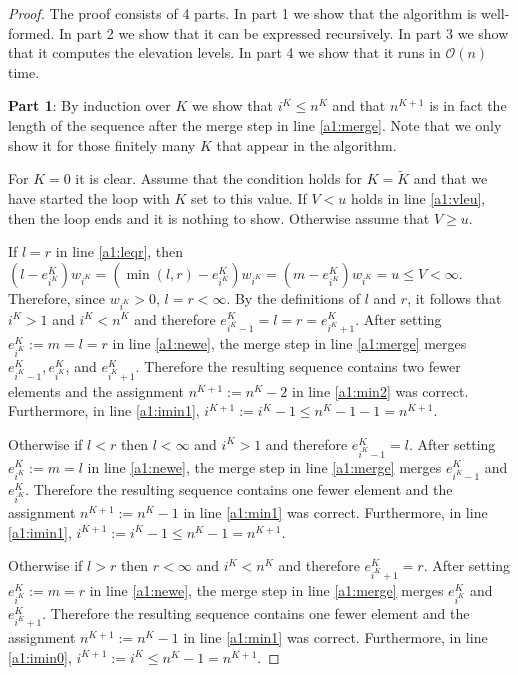 \documentclass[11pt,a4paper]{article}
\newcommand{\bO}{\mathcal{O}}
\begin{document}
\begin{proof}
The proof consists of 4 parts. In part 1 we show that the algorithm is well-formed.
In part 2 we show that it can be expressed recursively.
In part 3 we show that it computes the elevation levels.
In part 4 we show that it runs in $\bO(n)$ time.

\textbf{Part 1}: By induction over $K$ we show that $i^K \le n^K$ and that $n^{K+1}$ is in fact the length of the sequence after the merge step in line \ref{a1:merge}.
Note that we only show it for those finitely many $K$ that appear in the algorithm.

For $K=0$ it is clear.
Assume that the condition holds for $K = \tilde{K}$ and that we have started the loop with $K$ set to this value.
If $V < u$ holds in line \ref{a1:vleu}, then the loop ends and it is nothing to show.
Otherwise assume that $V \ge u$.

If $l = r$ in line \ref{a1:leqr}, then $(l - e_{i^K}^K)w_{i^K} = (\min(l,r) - e_{i^K}^K)w_{i^K} = (m - e_{i^K}^K)w_{i^K} = u \le V < \infty$.
Therefore, since $w_{i^K} > 0$, $l = r < \infty$.
By the definitions of $l$ and $r$, it follows that $i^K > 1$ and $i^K < n^K$ and therefore
$e_{i^K-1}^K = l = r = e_{i^K+1}^K$.
After setting $e_{i^K}^K := m = l = r$ in line \ref{a1:newe}, the merge step in line \ref{a1:merge} merges $e_{i^K - 1}^K, e_{i^K}^K$, and $e_{i^K + 1}^K$.
Therefore the resulting sequence contains two fewer elements and the assignment $n^{K+1} := n^K - 2$ in line \ref{a1:min2} was correct.
Furthermore, in line \ref{a1:imin1}, $i^{K+1} := i^K - 1 \le n^K - 1 - 1 = n^{K+1}$.

Otherwise if $l < r$ then $l < \infty$ and $i^K > 1$ and therefore $e_{i^K-1}^K = l$.
After setting $e_{i^K}^K := m = l$ in line \ref{a1:newe}, the merge step in line \ref{a1:merge} merges $e_{i^K - 1}^K$ and $e_{i^K}^K$.
Therefore the resulting sequence contains one fewer element and the assignment $n^{K+1} := n^K - 1$ in line \ref{a1:min1} was correct.
Furthermore, in line \ref{a1:imin1}, $i^{K+1} := i^K - 1 \le n^K - 1 = n^{K+1}$.

Otherwise if $l > r$ then $r < \infty$ and $i^K < n^K$ and therefore $e_{i^K+1}^K = r$.
After setting $e_{i^K}^K := m = r$ in line \ref{a1:newe}, the merge step in line \ref{a1:merge} merges $e_{i^K}^K$ and $e_{i^K + 1}^K$.
Therefore the resulting sequence contains one fewer element and the assignment $n^{K+1} := n^K - 1$ in line \ref{a1:min1} was correct.
Furthermore, in line \ref{a1:imin0}, $i^{K+1} := i^K \le n^K - 1 = n^{K+1}$.


\end{proof}
\end{document}
